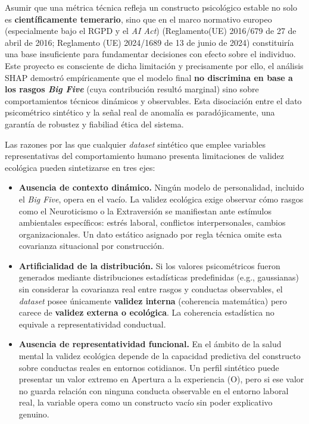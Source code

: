 \documentclass[IB]{TFUOC}%
\begin{document}
\medskip
\noindent Asumir que una métrica técnica refleja un constructo psicológico 
estable no solo es \textbf{científicamente temerario}, sino que en el marco 
normativo europeo (especialmente bajo el RGPD y el \textit{AI Act}) (Reglamento(UE) 2016/679 de 27 de abril de 2016; Reglamento (UE) 2024/1689 de 13 de junio de 2024) constituiría una base insuficiente para fundamentar decisiones con efecto sobre el individuo. Este proyecto es consciente de dicha limitación y precisamente por ello, el análisis SHAP demostró empíricamente que el modelo final \textbf{no discrimina en base a los rasgos \textit{Big Five}} (cuya 
contribución resultó marginal) sino sobre comportamientos técnicos dinámicos 
y observables. Esta disociación entre el dato psicométrico sintético y la 
señal real de anomalía es paradójicamente, una garantía de robustez y fiabiliad ética del sistema.

\medskip
\noindent Las razones por las que cualquier \textit{dataset} sintético que 
emplee variables representativas del comportamiento humano presenta 
limitaciones de validez ecológica pueden sintetizarse en tres ejes:

\begin{itemize}

    \item \textbf{Ausencia de contexto dinámico.} 
    Ningún modelo de personalidad, incluido el \textit{Big Five}, opera en 
    el vacío. La validez ecológica exige observar cómo rasgos como el 
    Neuroticismo o la Extraversión se manifiestan ante estímulos ambientales 
    específicos: estrés laboral, conflictos interpersonales, cambios 
    organizacionales. Un dato estático asignado por regla técnica omite 
    esta covarianza situacional por construcción.

    \item \textbf{Artificialidad de la distribución.} 
    Si los valores psicométricos fueron generados mediante distribuciones 
    estadísticas predefinidas (e.g., gaussianas) sin considerar la 
    covarianza real entre rasgos y conductas observables, el \textit{dataset} 
    posee únicamente \textbf{validez interna} (coherencia matemática) 
    pero carece de \textbf{validez externa o ecológica}. La coherencia 
    estadística no equivale a representatividad conductual.

    \item \textbf{Ausencia de representatividad funcional.} 
    En el ámbito de la salud mental la validez ecológica depende de la 
    capacidad predictiva del constructo sobre conductas reales en entornos 
    cotidianos. Un perfil sintético puede presentar un valor extremo en 
    Apertura a la experiencia (O), pero si ese valor no guarda relación 
    con ninguna conducta observable en el entorno laboral real, la variable 
    opera como un constructo vacío sin poder explicativo genuino.

\end{itemize}
\end{document}
